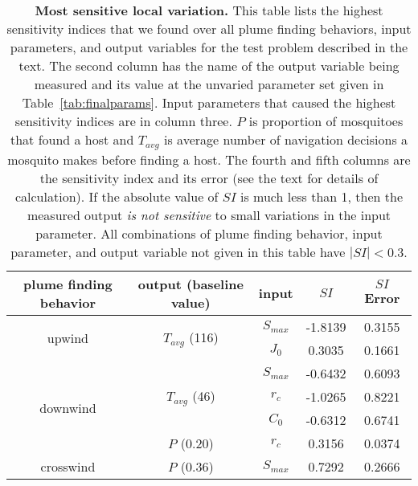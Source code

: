 \documentclass[10pt]{article}
\begin{document}
\begin{table}[!htp]
\caption{
{\bf Most sensitive local variation.} This table lists the highest sensitivity indices that we found over all plume finding behaviors, input parameters, and output variables for the test problem described in the text. The second column has the name of the output variable being measured and its value at the unvaried parameter set given in  Table~\ref{tab:finalparams}. Input parameters that caused the highest sensitivity indices are in column three. $P$ is proportion of mosquitoes that found a host and $T_{avg}$ is average number of navigation decisions a mosquito makes before finding a host. The fourth and fifth columns are the sensitivity index and its error (see the text for details of calculation). If the absolute value of $SI$ is much less than 1, then the measured output \textit{is not sensitive} to small variations in the input parameter. All combinations of plume finding behavior, input parameter, and output variable not given in this table have $|SI| < 0.3$. }
	\begin{center}
		\begin{tabular}{|c|c|c|c|c|}
			\hline
			plume finding behavior & output (baseline value) & input & $SI$ & $SI$ Error \\
			\hline
			\multirow{2}{*}{upwind} & \multirow{2}{*}{$T_{avg}$ (116)} & $S_{max}$  &  -1.8139 & 0.3155 \\
										& 						  & 	$J_0$&    0.3035 & 0.1661 \\
			\hline
			\multirow{5}{*}{downwind} & \multirow{3}{*}{$T_{avg}$ (46)} & $S_{max}$  & -0.6432 & 0.6093\\
										&								& $r_c$		&  -1.0265 & 0.8221\\						
										& 						  & 	$C_0$		&   -0.6312 & 0.6741\\
										\cline{2-5}
										 & \multirow{2}{*}{$P$ (0.20)}	& \multirow{2}{*}{$r_c$}  & \multirow{2}{*}{0.3156} & \multirow{2}{*}{0.0374}\\
										&&&&\\
			\hline
				\multirow{2}{*}{crosswind} & \multirow{2}{*}{$P$ (0.36)}	& \multirow{2}{*}{$S_{max}$} & \multirow{2}{*}{0.7292}  & \multirow{2}{*}{0.2666}\\
			&&&&\\
			\hline
		\end{tabular}
	\end{center}\label{tab:sensitivity}
\end{table}
\end{document}
